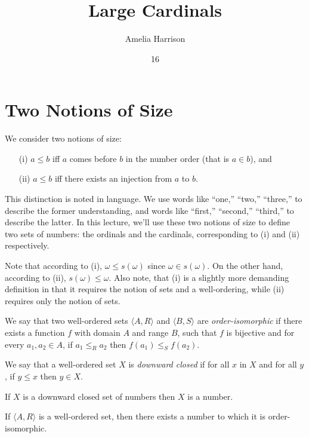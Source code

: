 \documentclass[english,course]{Notes}
\title{Large Cardinals}
\author{Amelia Harrison}
\date{16}{09}{2015}
\begin{document}
\section{Two Notions of Size}

We consider two notions of size: 
\begin{enumerate}
\item[(i)] $a \leq b$ iff $a$ comes before $b$ in the number order (that is $a 
\in b$), and
\item[(ii)] $a \leq b$ iff there exists an injection from $a$ to $b$. 
\end{enumerate}
This distinction is noted in language. We use words like ``one,'' ``two,'' 
``three,'' to describe the former understanding, and words like ``first,'' 
``second,'' ``third,'' to describe the latter. In this lecture, we'll use these 
two notions of size to define two sets of numbers: the ordinals and the 
cardinals, corresponding to (i) and (ii) respectively. 

Note that according to (i), $\omega \leq s(\omega)$ since $\omega \in s(\omega)$. On the other hand, 
according to (ii), $s(\omega) \leq \omega$.  
Also note, that (i) is a slightly more demanding definition in that it requires  
the notion of sets and a well-ordering, while (ii) requires only the notion of 
sets.  

\begin{definition}
We say that two well-ordered sets
$\langle A, R\rangle$ and $\langle B, S\rangle$ are 
{\sl order-isomorphic} if there exists a function $f$
with domain $A$ and range $B$, such that $f$ is bijective and for every $a_1, 
a_2 \in A$, if $a_1 \leq_R a_2$ then $f(a_1) \leq_S f(a_2)$.\end{definition}

\begin{definition}
We say that a well-ordered set $X$ is {\sl downward closed} if for all $x$ in 
$X$ and for all $y$, if $y \leq x$ then $y \in X$. 
\end{definition}

\begin{remark}
If $X$ is a downward closed set of numbers then $X$ is a number. 
\end{remark}

\begin{theorem}
If $\langle A,R\rangle$ is a well-ordered set, then there exists a number to 
which it is order-isomorphic. 
\end{theorem}
\end{document}
